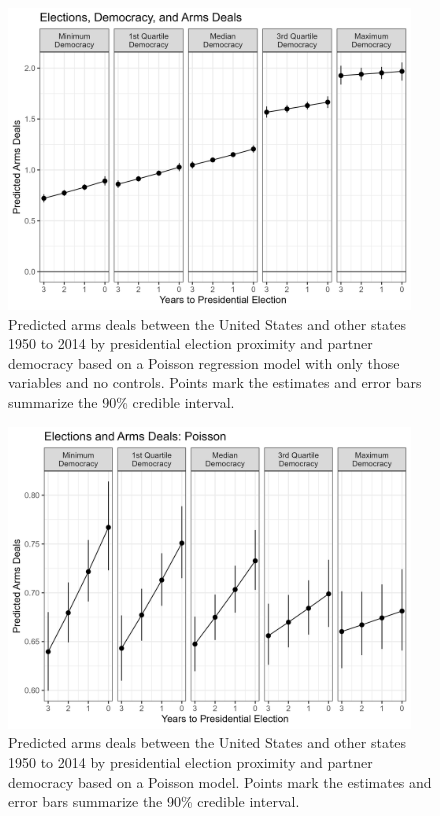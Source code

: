 \documentclass[12pt]{article}
\begin{document}
\begin{figure}[htpb]
	\centering
		\includegraphics[width=0.95\textwidth]{nocont-deals-pred.png}
	\caption{Predicted arms deals between the United States and other states 1950 to 2014 by presidential election proximity and partner democracy based on a Poisson regression model with only those variables and no controls. Points mark the estimates and error bars summarize the 90\% credible interval.}
	\label{fig:deals-pred-nocont}
\end{figure}



\begin{figure}[htpb]
	\centering
		\includegraphics[width=0.95\textwidth]{deals-pred-pois.png}
	\caption{Predicted arms deals between the United States and other states 1950 to 2014 by presidential election proximity and partner democracy based on a Poisson model. Points mark the estimates and error bars summarize the 90\% credible interval.}
	\label{fig:deals-pred-pois}
\end{figure}
\end{document}
